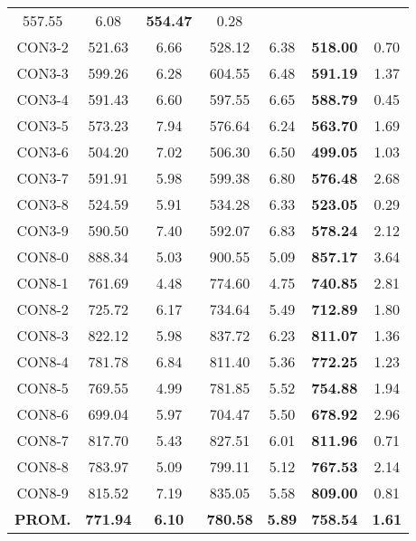 \begin{table}[ht]
\begin{tabular}{c c c c c c c}
557.55 & 6.08 & \bf{554.47} & 
0.28\\CON3-2 & 521.63 & 6.66 & 
528.12 & 6.38 & \bf{518.00} & 
0.70\\CON3-3 & 599.26 & 6.28 & 
604.55 & 6.48 & \bf{591.19} & 
1.37\\CON3-4 & 591.43 & 6.60 & 
597.55 & 6.65 & \bf{588.79} & 
0.45\\CON3-5 & 573.23 & 7.94 & 
576.64 & 6.24 & \bf{563.70} & 
1.69\\CON3-6 & 504.20 & 7.02 & 
506.30 & 6.50 & \bf{499.05} & 
1.03\\CON3-7 & 591.91 & 5.98 & 
599.38 & 6.80 & \bf{576.48} & 
2.68\\CON3-8 & 524.59 & 5.91 & 
534.28 & 6.33 & \bf{523.05} & 
0.29\\CON3-9 & 590.50 & 7.40 & 
592.07 & 6.83 & \bf{578.24} & 
2.12\\CON8-0 & 888.34 & 5.03 & 
900.55 & 5.09 & \bf{857.17} & 
3.64\\CON8-1 & 761.69 & 4.48 & 
774.60 & 4.75 & \bf{740.85} & 
2.81\\CON8-2 & 725.72 & 6.17 & 
734.64 & 5.49 & \bf{712.89} & 
1.80\\CON8-3 & 822.12 & 5.98 & 
837.72 & 6.23 & \bf{811.07} & 
1.36\\CON8-4 & 781.78 & 6.84 & 
811.40 & 5.36 & \bf{772.25} & 
1.23\\CON8-5 & 769.55 & 4.99 & 
781.85 & 5.52 & \bf{754.88} & 
1.94\\CON8-6 & 699.04 & 5.97 & 
704.47 & 5.50 & \bf{678.92} & 
2.96\\CON8-7 & 817.70 & 5.43 & 
827.51 & 6.01 & \bf{811.96} & 
0.71\\CON8-8 & 783.97 & 5.09 & 
799.11 & 5.12 & \bf{767.53} & 
2.14\\CON8-9 & 815.52 & 7.19 & 
835.05 & 5.58 & \bf{809.00} & 
0.81\\\bf{PROM.} & 
\bf{771.94} & \bf{6.10} & \bf{780.58} & \bf{5.89} & \bf{758.54} & \bf{1.61}\\[1ex]\hline
\end{tabular}
\label{table:nonlin}
\end{table} \clearpage
